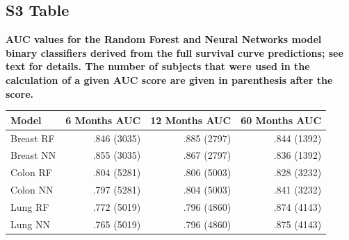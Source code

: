 \documentclass[10pt,letterpaper]{article}
\begin{document}
\subsection*{S3 Table}
\label{S3_Table}
{\bf AUC values for the Random Forest and Neural Networks model
binary classifiers derived from the full survival curve predictions; see text for details. The number of subjects that were used in the calculation of a given AUC score are given in parenthesis after the score.}
\begin{table}[!ht]
\begin{adjustwidth}{-2.25in}{0in} %
\begin{tabular}{lrrr}
\toprule
Model & 6 Months AUC & 12 Months AUC & 60 Months AUC \\ 
\midrule
Breast RF &  .846  (3035)     &     .885  (2797)         &  .844 (1392) \\ 
Breast NN &   .855 (3035)    &     .867  (2797)    &    .836  (1392) \\ 
Colon RF  &     .804 (5281)         &      .806 (5003)          &      .828   (3232)        \\ 
Colon NN   &     .797 (5281)         &          .804 (5003)        &   .841 (3232) \\ 
Lung RF    &      .772  (5019)             &        .796 (4860)              &   .874 (4143)  \\ 
Lung NN    &        .765  (5019)            &        .796  (4860)             &  .875 (4143)  \\
\bottomrule
\end{tabular}
\end{adjustwidth}
\end{table}
\end{document}

